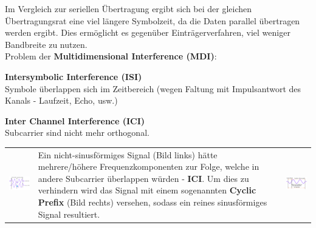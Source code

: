 Im Vergleich zur seriellen Übertragung ergibt sich bei der gleichen
Übertragungsrat eine viel längere
Symbolzeit, da die Daten parallel übertragen werden ergibt. Dies
ermöglicht es gegenüber Einträgerverfahren, viel weniger Bandbreite zu nutzen.
\\

Problem der \textbf{Multidimensional Interference (MDI)}:
\begin{liste}
    \item \textbf{Intersymbolic Interference (ISI)} \\
            Symbole überlappen sich im Zeitbereich (wegen Faltung mit Impulsantwort des Kanals - Laufzeit, Echo, usw.)
    \item \textbf{Inter Channel Interference (ICI)} \\
            Subcarrier sind nicht mehr orthogonal. \\
\end{liste}

\begin{tabular}{lll}
	\parbox{6cm}{ 
    \includegraphics[width=6cm]{./bilder/modulation_OFDM-ICI.png}\\
	}    
	& \parbox{6cm}{Ein nicht-sinusförmiges Signal (Bild links) hätte mehrere/höhere
	Frequenzkomponenten zur Folge, welche in andere Subcarrier überlappen würden -
	\textbf{ICI}. Um dies zu verhindern wird das Signal mit einem sogenannten \textbf{Cyclic
	Prefix} (Bild rechts) versehen, sodass ein reines sinusförmiges Signal
	resultiert. \\	
	} &
	\parbox{6cm}{
	\includegraphics[width=6cm]{./bilder/modulation_OFDM-prefix.png}\\ }       
\end{tabular}


